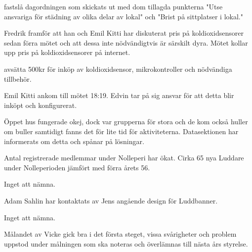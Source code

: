 \documentclass{protokoll}
\begin{document}
\newpage  


\begin{beslut}
     \att fastslå dagordningen som skickats ut med dom tillagda punkterna "Utse ansvariga för städning av olika delar av lokal" och "Brist på sittplatser i lokal."
\end{beslut}

Fredrik framför att han och Emil Kitti har diskuterat pris på koldioxidsensorer sedan förra mötet och att dessa inte nödvändigtvis är särskilt dyra. 
Mötet kollar upp pris på koldioxidsensorer på internet.
\begin{beslut}
    \att avsätta 500kr för inköp av koldioxidsensor, mikrokontroller och nödvändiga tillbehör.
\end{beslut}
Emil Kitti ankom till mötet 18:19.
Edvin tar på sig ansvar för att detta blir inköpt och konfigurerat. 

Öppet hus fungerade okej, dock var grupperna för stora och de kom också huller om buller samtidigt fanns det för lite tid för aktiviteterna. Datasektionen har informerats om detta och spånar på lösningar. 

Antal registrerade medlemmar under Nolleperi har ökat. Cirka 65 nya Luddare under Nolleperioden jämfört med förra årets 56.

Inget att nämna.

Adam Sahlin har kontaktats av Jens angående design för Luddbanner.

Inget att nämna. 

Målandet av Vicke gick bra i det första steget, vissa svårigheter och problem uppstod under målningen som ska noteras och överlämnas till nästa års styrelse. 
\end{document}
